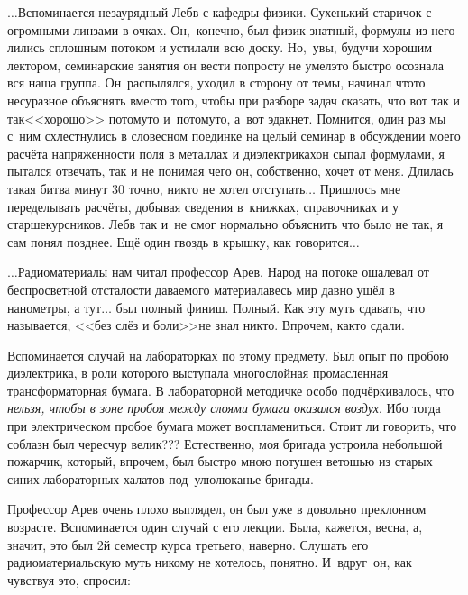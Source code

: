 \vspace{1.0cm}

$\ldots$Вспоминается незаурядный Леб\sdash в с кафедры физики. Сухенький старичок с огромными линзами в очках. Он,~конечно, был физик знатный, формулы из него лились сплошным потоком и устилали всю доску. Но,~увы, будучи хорошим лектором, семинарские занятия он вести попросту не умел\mdash это быстро осознала вся наша группа. Он~распылялся, уходил в сторону от темы, начинал что\sdash то несуразное объяснять вместо того, чтобы при разборе задач сказать, что вот так и так\mdash <<хорошо>> потому\sdash то и~потому\sdash то, а~вот эдак\mdash нет. Помнится, один раз мы с~ним схлестнулись в словесном поединке на целый семинар в обсуждении моего расчёта напряженности поля в металлах и диэлектриках\mdash он сыпал формулами, я пытался отвечать, так и не понимая чего он, собственно, хочет от меня. Длилась такая битва минут 30 точно, никто не хотел отступать$\ldots$ Пришлось мне переделывать расчёты, добывая сведения в~книжках, справочниках и у старшекурсников. Леб\sdash в так и~не смог нормально объяснить что было не так, я сам понял позднее. Ещё один гвоздь в крышку, как говорится$\ldots$

\vspace{1.0cm}

$\ldots$Радиоматериалы нам читал профессор Ар\sdash ев. Народ на потоке ошалевал от беспросветной отсталости даваемого материала\mdash весь мир давно ушёл в нанометры, а тут$\ldots$ был полный финиш. Полный. Как эту муть сдавать, что называется, <<без слёз и боли>>\mdash не знал никто. Впрочем, как\sdash то сдали. 

Вспоминается случай на лабораторках по этому предмету. Был опыт по пробою диэлектрика, в роли которого выступала многослойная промасленная трансформаторная бумага. В лабораторной методичке особо подчёркивалось, что \textit{нельзя, чтобы в зоне пробоя между слоями бумаги оказался воздух}. Ибо тогда при электрическом пробое бумага может воспламениться. Стоит ли говорить, что соблазн был чересчур велик??? Естественно, моя бригада устроила небольшой пожарчик, который, впрочем, был быстро мною потушен ветошью из старых синих лабораторных халатов под~улюлюканье бригады.

Профессор Ар\sdash ев очень плохо выглядел, он был уже в довольно преклонном возрасте. Вспоминается один случай с его лекции. Была, кажется, весна, а, значит, это был 2\sdash й семестр курса третьего, наверно. Слушать его радиоматериальскую муть никому не хотелось, понятно. И~вдруг~он, как чувствуя это, спросил:

